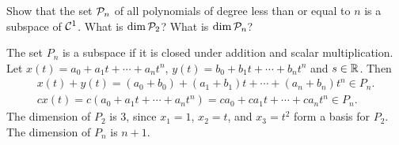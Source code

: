 \documentclass{ximera}
\begin{document}
\begin{exercise} \label{c5.5.5}
Show that the set ${\cal P}_n$ of all polynomials of degree less than
or equal to $n$ is a subspace of ${\cal C}^1$.  What is $\dim {\cal P}_2$?
What is $\dim {\cal P}_n$?

\begin{solution}

The set $P_n$ is a subspace if it is closed under addition and
scalar multiplication.  Let $x(t) = a_0 + a_1t + \cdots +
a_nt^n$, $y(t) = b_0 + b_1t + \cdots + b_nt^n$ and $s \in \mbox{$\Bbb{R}$}$.
Then
\[
\begin{array}{l}
x(t) + y(t) = (a_0 + b_0) + (a_1 + b_1)t + \cdots + (a_n + b_n)t^n \in P_n.
\\
cx(t) = c(a_0 + a_1t + \cdots + a_nt^n) = ca_0 + ca_1t + \cdots + ca_nt^n
\in P_n.
\end{array}
\]
The dimension of $P_2$ is 3, since $x_1 = 1$, $x_2 = t$, and
$x_3 = t^2$ form a basis for $P_2$.  The dimension of $P_n$ is
$n + 1$.

\end{solution}
\end{exercise}
\end{document}
